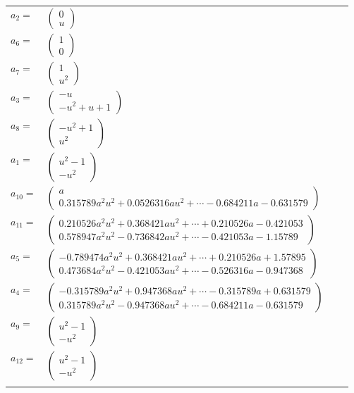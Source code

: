 \documentclass[1p]{elsarticle_modified}
\theoremstyle{definition}
\begin{document}
\begin{tabular}{m{7pt} m{180pt} m{7pt} m{180pt} }
\flushright $a_{2}=$&$\begin{pmatrix}0\\u\end{pmatrix}$ \\
\flushright $a_{6}=$&$\begin{pmatrix}1\\0\end{pmatrix}$ \\
\flushright $a_{7}=$&$\begin{pmatrix}1\\u^2\end{pmatrix}$ \\
\flushright $a_{3}=$&$\begin{pmatrix}- u\\- u^2+u+1\end{pmatrix}$ \\
\flushright $a_{8}=$&$\begin{pmatrix}- u^2+1\\u^2\end{pmatrix}$ \\
\flushright $a_{1}=$&$\begin{pmatrix}u^2-1\\- u^2\end{pmatrix}$ \\
\flushright $a_{10}=$&$\begin{pmatrix}a\\0.315789 a^{2} u^{2}+0.0526316 a u^{2}+\cdots-0.684211 a-0.631579\end{pmatrix}$ \\
\flushright $a_{11}=$&$\begin{pmatrix}0.210526 a^{2} u^{2}+0.368421 a u^{2}+\cdots+0.210526 a-0.421053\\0.578947 a^{2} u^{2}-0.736842 a u^{2}+\cdots-0.421053 a-1.15789\end{pmatrix}$ \\
\flushright $a_{5}=$&$\begin{pmatrix}-0.789474 a^{2} u^{2}+0.368421 a u^{2}+\cdots+0.210526 a+1.57895\\0.473684 a^{2} u^{2}-0.421053 a u^{2}+\cdots-0.526316 a-0.947368\end{pmatrix}$ \\
\flushright $a_{4}=$&$\begin{pmatrix}-0.315789 a^{2} u^{2}+0.947368 a u^{2}+\cdots-0.315789 a+0.631579\\0.315789 a^{2} u^{2}-0.947368 a u^{2}+\cdots-0.684211 a-0.631579\end{pmatrix}$ \\
\flushright $a_{9}=$&$\begin{pmatrix}u^2-1\\- u^2\end{pmatrix}$ \\
\flushright $a_{12}=$&$\begin{pmatrix}u^2-1\\- u^2\end{pmatrix}$\\&\end{tabular}
\end{document}
